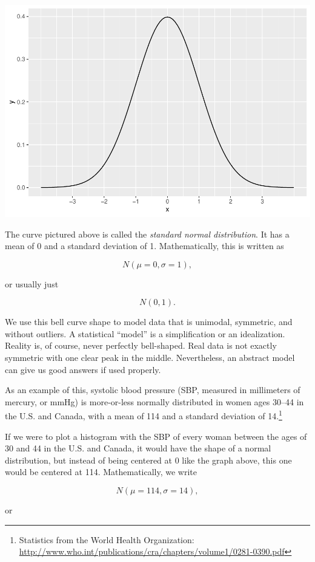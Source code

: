 \documentclass[
]{book}
\begin{document}
\includegraphics{intro_stats_files/figure-latex/unnamed-chunk-336-1.pdf}

The curve pictured above is called the \emph{standard normal distribution}. It has a mean of 0 and a standard deviation of 1. Mathematically, this is written as

\[
N(\mu = 0, \sigma = 1),
\]

or usually just

\[
N(0, 1).
\]

We use this bell curve shape to model data that is unimodal, symmetric, and without outliers. A statistical ``model'' is a simplification or an idealization. Reality is, of course, never perfectly bell-shaped. Real data is not exactly symmetric with one clear peak in the middle. Nevertheless, an abstract model can give us good answers if used properly.

As an example of this, systolic blood pressure (SBP, measured in millimeters of mercury, or mmHg) is more-or-less normally distributed in women ages 30--44 in the U.S. and Canada, with a mean of 114 and a standard deviation of 14.\footnote{Statistics from the World Health Organization: \url{http://www.who.int/publications/cra/chapters/volume1/0281-0390.pdf}}

If we were to plot a histogram with the SBP of every woman between the ages of 30 and 44 in the U.S. and Canada, it would have the shape of a normal distribution, but instead of being centered at 0 like the graph above, this one would be centered at 114. Mathematically, we write

\[
N(\mu = 114, \sigma = 14),
\]

or
\end{document}
